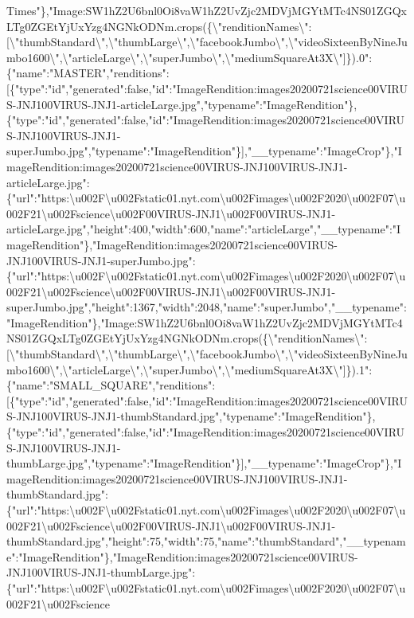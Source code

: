 Times"\},"Image:SW1hZ2U6bnl0Oi8vaW1hZ2UvZjc2MDVjMGYtMTc4NS01ZGQxLTg0ZGEtYjUxYzg4NGNkODNm.crops(\{\textbackslash{}"renditionNames\textbackslash{}":{[}\textbackslash{}"thumbStandard\textbackslash{}",\textbackslash{}"thumbLarge\textbackslash{}",\textbackslash{}"facebookJumbo\textbackslash{}",\textbackslash{}"videoSixteenByNineJumbo1600\textbackslash{}",\textbackslash{}"articleLarge\textbackslash{}",\textbackslash{}"superJumbo\textbackslash{}",\textbackslash{}"mediumSquareAt3X\textbackslash{}"{]}\}).0":\{"name":"MASTER","renditions":{[}\{"type":"id","generated":false,"id":"ImageRendition:images20200721science00VIRUS-JNJ100VIRUS-JNJ1-articleLarge.jpg","typename":"ImageRendition"\},\{"type":"id","generated":false,"id":"ImageRendition:images20200721science00VIRUS-JNJ100VIRUS-JNJ1-superJumbo.jpg","typename":"ImageRendition"\}{]},"\_\_typename":"ImageCrop"\},"ImageRendition:images20200721science00VIRUS-JNJ100VIRUS-JNJ1-articleLarge.jpg":\{"url":"https:\textbackslash{}u002F\textbackslash{}u002Fstatic01.nyt.com\textbackslash{}u002Fimages\textbackslash{}u002F2020\textbackslash{}u002F07\textbackslash{}u002F21\textbackslash{}u002Fscience\textbackslash{}u002F00VIRUS-JNJ1\textbackslash{}u002F00VIRUS-JNJ1-articleLarge.jpg","height":400,"width":600,"name":"articleLarge","\_\_typename":"ImageRendition"\},"ImageRendition:images20200721science00VIRUS-JNJ100VIRUS-JNJ1-superJumbo.jpg":\{"url":"https:\textbackslash{}u002F\textbackslash{}u002Fstatic01.nyt.com\textbackslash{}u002Fimages\textbackslash{}u002F2020\textbackslash{}u002F07\textbackslash{}u002F21\textbackslash{}u002Fscience\textbackslash{}u002F00VIRUS-JNJ1\textbackslash{}u002F00VIRUS-JNJ1-superJumbo.jpg","height":1367,"width":2048,"name":"superJumbo","\_\_typename":"ImageRendition"\},"Image:SW1hZ2U6bnl0Oi8vaW1hZ2UvZjc2MDVjMGYtMTc4NS01ZGQxLTg0ZGEtYjUxYzg4NGNkODNm.crops(\{\textbackslash{}"renditionNames\textbackslash{}":{[}\textbackslash{}"thumbStandard\textbackslash{}",\textbackslash{}"thumbLarge\textbackslash{}",\textbackslash{}"facebookJumbo\textbackslash{}",\textbackslash{}"videoSixteenByNineJumbo1600\textbackslash{}",\textbackslash{}"articleLarge\textbackslash{}",\textbackslash{}"superJumbo\textbackslash{}",\textbackslash{}"mediumSquareAt3X\textbackslash{}"{]}\}).1":\{"name":"SMALL\_SQUARE","renditions":{[}\{"type":"id","generated":false,"id":"ImageRendition:images20200721science00VIRUS-JNJ100VIRUS-JNJ1-thumbStandard.jpg","typename":"ImageRendition"\},\{"type":"id","generated":false,"id":"ImageRendition:images20200721science00VIRUS-JNJ100VIRUS-JNJ1-thumbLarge.jpg","typename":"ImageRendition"\}{]},"\_\_typename":"ImageCrop"\},"ImageRendition:images20200721science00VIRUS-JNJ100VIRUS-JNJ1-thumbStandard.jpg":\{"url":"https:\textbackslash{}u002F\textbackslash{}u002Fstatic01.nyt.com\textbackslash{}u002Fimages\textbackslash{}u002F2020\textbackslash{}u002F07\textbackslash{}u002F21\textbackslash{}u002Fscience\textbackslash{}u002F00VIRUS-JNJ1\textbackslash{}u002F00VIRUS-JNJ1-thumbStandard.jpg","height":75,"width":75,"name":"thumbStandard","\_\_typename":"ImageRendition"\},"ImageRendition:images20200721science00VIRUS-JNJ100VIRUS-JNJ1-thumbLarge.jpg":\{"url":"https:\textbackslash{}u002F\textbackslash{}u002Fstatic01.nyt.com\textbackslash{}u002Fimages\textbackslash{}u002F2020\textbackslash{}u002F07\textbackslash{}u002F21\textbackslash{}u002Fscience\tex